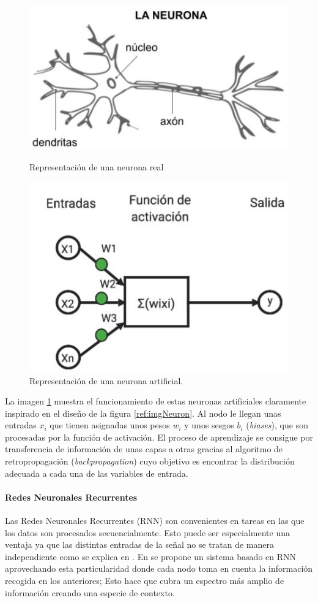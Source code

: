 \documentclass[11pt,a4paper,spanish]{book}
\begin{document}
	
	\begin{figure}[!htb]
		\begin{minipage}{0.48\textwidth}
			\centering
			\includegraphics[width=.8\textwidth]{neurona.JPG}
			\caption{Representación de una neurona real}
			\label{ref:imgNeuron}
		\end{minipage}\hfill
		\begin{minipage}{0.48\textwidth}
			\centering
			\includegraphics[width=.6\textwidth]{neuronaArtificial.JPG}\hfill
			\caption{Representación de una neurona artificial.}
			\label{ref:imgArtNeuron}
		\end{minipage}
	\end{figure}

	La imagen \ref{ref:imgArtNeuron} muestra el funcionamiento de estas neuronas artificiales claramente inspirado en el diseño de la figura \ref{ref:imgNeuron}. Al nodo le llegan unas entradas $x_i$ que tienen asignadas unos pesos $w_i$ y unos sesgos $b_i$ (\emph{biases}), que son procesadas por la función de activación. El proceso de aprendizaje se consigue por transferencia de información de unas capas a otras gracias al algoritmo de retropropagación (\emph{backpropagation}) cuyo objetivo es encontrar la distribución adecuada a cada una de las variables de entrada.

	
	\paragraph{Redes Neuronales Recurrentes}\hfill \break
	Las Redes Neuronales Recurrentes (RNN) son convenientes en tareas en las que los datos son procesados secuencialmente. Esto puede ser especialmente una ventaja ya que las distintas entradas de la señal no se tratan de manera independiente como se explica en \cite{Lim2017}. En \cite{Lee2015} se propone un sistema basado en RNN aprovechando esta particularidad donde cada nodo toma en cuenta la información recogida en los anteriores; Esto hace que cubra un espectro más amplio de información creando una especie de contexto.
	
\end{document}

